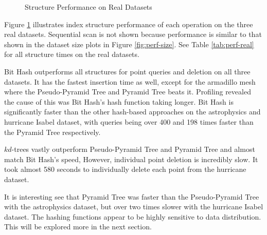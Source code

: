 \begin{figure}
	\caption{Structure Performance on Real Datasets}
	\label{fig:perf-real}
\end{figure}

Figure \ref{fig:perf-real} illustrates index structure performance of each operation on the three real datasets. Sequential scan is not shown because performance is similar to that shown in the dataset size plots in Figure \ref{fig:perf-size}. See Table \ref{tab:perf-real} for all structure times on the real datasets.

Bit Hash outperforms all structures for point queries and deletion on all three datasets. It has the fastest insertion time as well, except for the armadillo mesh where the Pseudo-Pyramid Tree and Pyramid Tree beats it. Profiling revealed the cause of this was Bit Hash's hash function taking longer. Bit Hash is significantly faster than the other hash-based approaches on the astrophysics and hurricane Isabel dataset, with queries being over 400 and 198 times faster than the Pyramid Tree respectively.

$kd$-trees vastly outperform Pseudo-Pyramid Tree and Pyramid Tree and almost match Bit Hash's speed, However, individual point deletion is incredibly slow. It took almost 580 seconds to individually delete each point from the hurricane dataset.

It is interesting see that Pyramid Tree was faster than the Pseudo-Pyramid Tree with the astrophysics dataset, but over two times slower with the hurricane Isabel dataset. The hashing functions appear to be highly sensitive to data distribution. This will be explored more in the next section.


